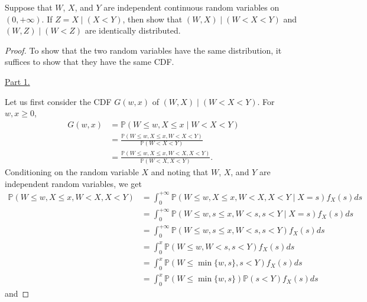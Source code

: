 \documentclass[stat_333_lecture_notes.tex]{subfiles}
\begin{document}

\begin{Example}
    Suppose that \(W\), \(X\), and \(Y\) are independent continuous random variables on \((0,+\infty)\).
    If \(Z = X \mid (X<Y)\), then show that \((W,X) \mid (W<X<Y)\) and \((W,Z) \mid (W<Z)\) are identically distributed.
\end{Example}
\begin{proof}

    To show that the two random variables have the same distribution,
    it suffices to show that they have the same CDF.

    \noindent \underline{Part 1.}

    Let us first consider the CDF \(G(w,x)\) of \((W,X) \mid (W<X<Y)\).
    For \(w,x \geq 0\),
    \begin{align*}
        G(w,x) & = \mathbb{P}(W \leq w, X \leq x \mid W<X<Y)                              \\
               & = \frac{\mathbb{P}(W \leq w, X \leq x, W<X<Y)}{\mathbb{P}(W<X<Y)}        \\
               & = \frac{\mathbb{P}(W \leq w, X \leq x, W<X, X<Y)}{\mathbb{P}(W<X, X<Y)}.
    \end{align*}
    Conditioning on the random variable \(X\) and noting that
    \(W\), \(X\), and \(Y\) are independent random variables, we get
    \begin{align*}
        \mathbb{P}(W \leq w, X \leq x, W < X, X<Y) & = \int_{0}^{+\infty}\mathbb{P}(W \leq w, X \leq x, W<X, X<Y \mid X=s)f_{X}(s)ds \\
                                                   & = \int_{0}^{+\infty}\mathbb{P}(W \leq w, s \leq x, W<s, s<Y \mid X=s)f_{X}(s)ds \\
                                                   & = \int_{0}^{+\infty}\mathbb{P}(W \leq w, s \leq x, W<s, s<Y)f_{X}(s)ds          \\
                                                   & = \int_{0}^{x}\mathbb{P}(W \leq w, W<s, s<Y)f_{X}(s)ds                          \\
                                                   & = \int_{0}^{x}\mathbb{P}(W \leq \min\{w,s\}, s<Y)f_{X}(s)ds                     \\
                                                   & = \int_{0}^{x}\mathbb{P}(W \leq \min\{w,s\})\mathbb{P}(s<Y)f_{X}(s)ds
    \end{align*}
    and

\end{proof}
\end{document}
